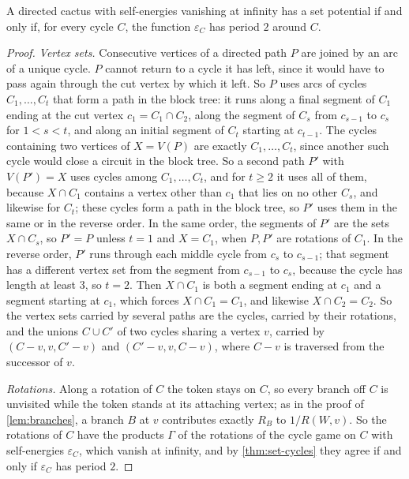 \begin{theorem}\label{thm:cacti}
A directed cactus with self-energies vanishing at infinity has a set potential if and only if, for every cycle $C$, the function $\varepsilon_C$ has period $2$ around $C$.
\end{theorem}
\begin{proof}
\emph{Vertex sets.} Consecutive vertices of a directed path $P$ are joined by an arc of a unique cycle. $P$ cannot return to a cycle it has left, since it would have to pass again through the cut vertex by which it left. So $P$ uses arcs of cycles $C_1,\dots,C_t$ that form a path in the block tree: it runs along a final segment of $C_1$ ending at the cut vertex $c_1=C_1\cap C_2$, along the segment of $C_s$ from $c_{s-1}$ to $c_s$ for $1<s<t$, and along an initial segment of $C_t$ starting at $c_{t-1}$. The cycles containing two vertices of $X=V(P)$ are exactly $C_1,\dots,C_t$, since another such cycle would close a circuit in the block tree. So a second path $P'$ with $V(P')=X$ uses cycles among $C_1,\dots,C_t$, and for $t\ge2$ it uses all of them, because $X\cap C_1$ contains a vertex other than $c_1$ that lies on no other $C_s$, and likewise for $C_t$; these cycles form a path in the block tree, so $P'$ uses them in the same or in the reverse order. In the same order, the segments of $P'$ are the sets $X\cap C_s$, so $P'=P$ unless $t=1$ and $X=C_1$, when $P,P'$ are rotations of $C_1$. In the reverse order, $P'$ runs through each middle cycle from $c_s$ to $c_{s-1}$; that segment has a different vertex set from the segment from $c_{s-1}$ to $c_s$, because the cycle has length at least $3$, so $t=2$. Then $X\cap C_1$ is both a segment ending at $c_1$ and a segment starting at $c_1$, which forces $X\cap C_1=C_1$, and likewise $X\cap C_2=C_2$. So the vertex sets carried by several paths are the cycles, carried by their rotations, and the unions $C\cup C'$ of two cycles sharing a vertex $v$, carried by $(C-v,v,C'-v)$ and $(C'-v,v,C-v)$, where $C-v$ is traversed from the successor of $v$.

\emph{Rotations.} Along a rotation of $C$ the token stays on $C$, so every branch off $C$ is unvisited while the token stands at its attaching vertex; as in the proof of \cref{lem:branches}, a branch $B$ at $v$ contributes exactly $R_B$ to $1/R(W,v)$. So the rotations of $C$ have the products $\Gamma$ of the rotations of the cycle game on $C$ with self-energies $\varepsilon_C$, which vanish at infinity, and by \cref{thm:set-cycles} they agree if and only if $\varepsilon_C$ has period $2$.


\end{proof}
